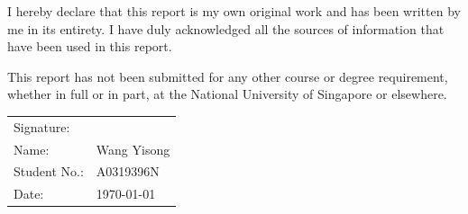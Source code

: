 I hereby declare that this report is my own original work and has been
written by me in its entirety. I have duly acknowledged all the sources
of information that have been used in this report.

This report has not been submitted for any other course or degree
requirement, whether in full or in part, at the National University of
Singapore or elsewhere.

\vspace{2.5cm}

\noindent
\begin{tabular}{@{}ll@{}}
Signature: & \underline{\hspace{5cm}} \\[12pt]
Name:      & Wang Yisong \\[6pt]
Student No.: & A0319396N \\[6pt]
Date:      & \today \\
\end{tabular}
